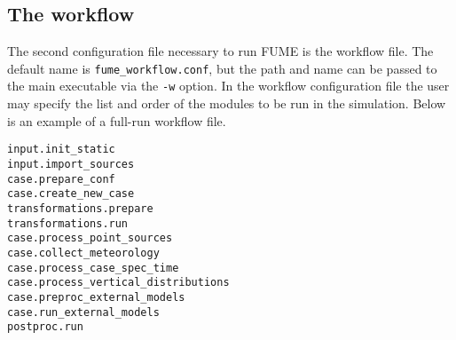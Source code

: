 \documentclass[a4paper,11pt]{article}
\begin{document}
\subsection{The workflow}\label{workflow}
The second configuration file necessary to run FUME is the workflow file. The default name is \verb|fume_workflow.conf|, but the path and name can be passed to the main executable via the \verb|-w| option. In the workflow configuration file the user may specify the list and order of the modules to be run in the simulation. Below is an example of a full-run workflow file.
\begin{verbatim}
input.init_static                              
input.import_sources       
case.prepare_conf                  
case.create_new_case                           
transformations.prepare                        
transformations.run                            
case.process_point_sources                     
case.collect_meteorology                       
case.process_case_spec_time  
case.process_vertical_distributions
case.preproc_external_models                   
case.run_external_models                       
postproc.run                                   
\end{verbatim}
\end{document}
